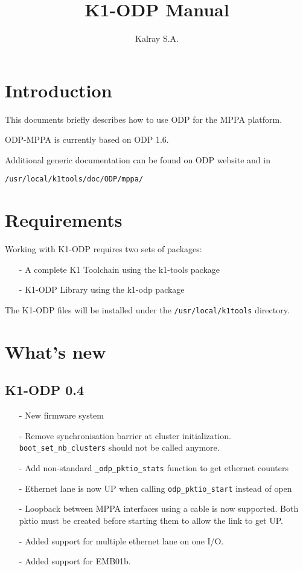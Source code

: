 \documentclass{trkalray}
\author{%
Kalray S.A.\autref{1}
}
\institute{%
\autlabel{1} \email{support@kalray.eu},
Kalray S.A.
}
\title{K1-ODP Manual}
\begin{document}
\maketitle

\tableofcontents

\newpage
\section{Introduction}

This documents briefly describes how to use ODP for the MPPA platform.

ODP-MPPA is currently based on ODP 1.6.

Additional generic documentation can be found on ODP website and in
\begin{lstlisting}
/usr/local/k1tools/doc/ODP/mppa/
\end{lstlisting}

\section{Requirements}

Working with K1-ODP requires two sets of packages:
\begin{itemize}
\item[-]{A complete K1 Toolchain using the k1-tools package}
\item[-]{K1-ODP Library using the k1-odp package}
\end{itemize}

The K1-ODP files will be installed under the
\texttt{/usr/local/k1tools} directory.

\section{What's new}
\subsection{K1-ODP 0.4}
\begin{itemize}
\item[-]{New firmware system}
\item[-]{Remove synchronisation barrier at cluster
  initialization. \texttt{boot\_set\_nb\_clusters} should not be
  called anymore.}
\item[-]{Add non-standard \texttt{\_odp\_pktio\_stats} function to get
ethernet counters}
\item[-]{Ethernet lane is now UP when calling
  \texttt{odp\_pktio\_start} instead of open}
\item[-]{Loopback between MPPA interfaces using a cable is now
  supported. Both pktio must be created before starting them to allow
  the link to get UP.}
\item[-]{Added support for multiple ethernet lane on one I/O.}
\item[-]{Added support for EMB01b.}
\end{itemize}
\end{document}
